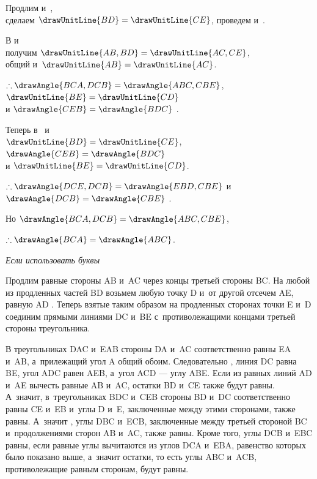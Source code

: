 \documentclass[letters,booklanguage=russian]{byrnebook}
\begin{document}
\begin{center}
Продлим  и~,\drawCurrentPictureInMargin\\
сделаем $\drawUnitLine{BD} = \drawUnitLine{CE}$, проведем  и~.

В
и
\\
получим $\drawUnitLine{AB,BD} = \drawUnitLine{AC,CE}$,\\
 общий и~$\drawUnitLine{AB} = \drawUnitLine{AC}$.

$\therefore \drawAngle{BCA,DCB} = \drawAngle{ABC,CBE}$, $\drawUnitLine{BE} = \drawUnitLine{CD}$\\
и $\drawAngle{CEB} = \drawAngle{BDC}$ .

Теперь в~ и~\\
$\drawUnitLine{BD} = \drawUnitLine{CE}$, $\drawAngle{CEB} = \drawAngle{BDC}$\\
и $\drawUnitLine{BE} = \drawUnitLine{CD}$.

$\therefore \drawAngle{DCE,DCB} = \drawAngle{EBD,CBE}$
и $\drawAngle{DCB} = \drawAngle{CBE}$ .

Но $\drawAngle{BCA,DCB} = \drawAngle{ABC,CBE}$, 

$\therefore \drawAngle{BCA} = \drawAngle{ABC}$.
\end{center}

\qedNB

\begin{center}
\emph{Если использовать буквы}
\end{center}

Продлим равные стороны AB и~AC через концы третьей стороны BC. На любой из продленных частей BD возьмем любую точку D и~от другой отсечем AE, равную AD . Теперь взятые таким образом на продленных сторонах точки E и~D соединим прямыми линиями DC и~BE с~противолежащими концами третьей стороны треугольника.

В треугольниках DAC и~EAB стороны DA и~AC соответственно равны EA и~AB, а~прилежащий угол A общий обоим. Следовательно , линия DC равна BE, угол ADC равен AEB, а~угол ACD — углу ABE. Если из равных линий AD и~AE вычесть равные AB и~AC, остатки BD и~CE также будут равны. А~значит, в~треугольниках BDC и~CEB стороны BD и~DC соответственно равны CE и~EB и~углы D и~E, заключенные между этими сторонами, также равны. А~значит , углы DBC и~ECB, заключенные между третьей стороной BC и~продолжениями сторон AB и~AC, также равны. Кроме того, углы DCB и~EBC равны, если равные углы вычитаются из углов DCA и~EBA, равенство которых было показано выше, а~значит остатки, то есть углы ABC и~ACB, противолежащие равным сторонам, будут равны.
\end{document}
